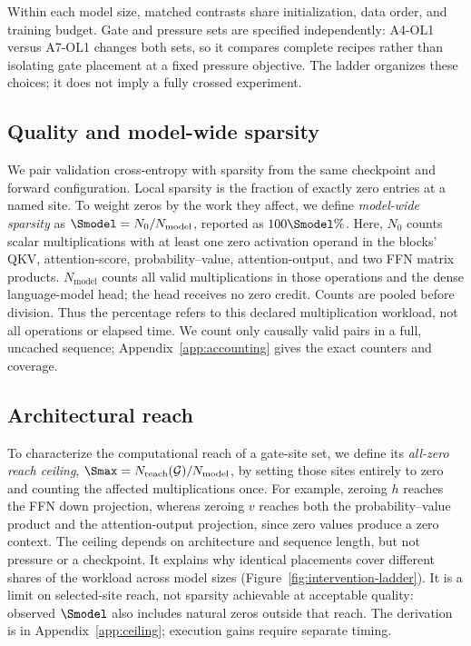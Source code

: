 Within each model size, matched contrasts share initialization, data order,
and training budget.
Gate and pressure sets are specified independently: A4-OL1 versus A7-OL1
changes both sets, so it compares complete recipes rather than isolating gate
placement at a fixed pressure objective. The ladder organizes these choices;
it does not imply a fully crossed experiment.

\subsection{Quality and model-wide sparsity}
\label{sec:measurement}

We pair validation cross-entropy with sparsity from the same checkpoint and
forward configuration. Local sparsity is the fraction of exactly zero entries
at a named site. To weight zeros by the work they affect, we define
\emph{model-wide sparsity} as $\Smodel=N_0/N_{\mathrm{model}}$, reported as
$100\Smodel\%$. Here, $N_0$ counts scalar multiplications with at least one
zero activation operand in the blocks' QKV, attention-score, probability--value,
attention-output, and two FFN matrix products. $N_{\mathrm{model}}$ counts all
valid multiplications in those operations and the dense language-model head;
the head receives no zero credit. Counts are pooled before division. Thus the
percentage refers to this declared multiplication workload, not all operations
or elapsed time. We count only causally valid pairs in a full, uncached
sequence; Appendix~\ref{app:accounting} gives the exact counters and coverage.

\subsection{Architectural reach}
\label{sec:reach}

To characterize the computational reach of a gate-site set, we define its \emph{all-zero reach ceiling},
$\Smax=N_{\mathrm{reach}}(\mathcal{G})/N_{\mathrm{model}}$, by setting those
sites entirely to zero and counting the affected multiplications once.
For example, zeroing $h$ reaches the FFN down projection, whereas zeroing $v$
reaches both the probability--value product and the attention-output projection, since zero values produce a zero context.
The ceiling depends on architecture and sequence length, but not pressure or
a checkpoint. It explains why identical placements cover different shares of
the workload across model sizes (Figure~\ref{fig:intervention-ladder}).
It is a limit on selected-site reach, not sparsity achievable at acceptable
quality: observed $\Smodel$ also includes natural zeros outside that reach.
The derivation is in Appendix~\ref{app:ceiling}; execution gains require
separate timing.
